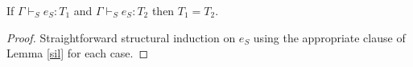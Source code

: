 \begin{suotl}
\label{suotl}
If $\Gamma\vdash_{S}e_{S}:T_{1}$ and $\Gamma\vdash_{S}e_{S}:T_{2}$ then $T_{1}=T_{2}$.
\begin{proof}
Straightforward structural induction on $e_{S}$ using the appropriate clause of Lemma \ref{sil} for each case.
\end{proof}
\end{suotl}